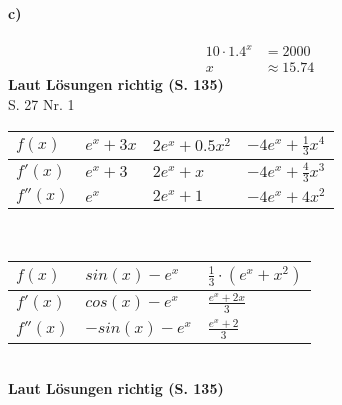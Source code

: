 \documentclass[12pt,a4paper]{report}
\newcommand{\richtig}[1]{\color{ForestGreen}\textbf{
	Laut Lösungen richtig (S. #1)
}\color{black}}
\begin{document}
	\paragraph{c)}
	\begin{align*}
		10 \cdot 1.4^x &= 2000 \\
		x &\approx 15.74
	\end{align*}
	\richtig{135}
	\\[0.5cm]
	\Large S. 27 Nr. 1
	\large
	\noindent \\[0.5cm]
	\begin{tabularx}{\linewidth}{|X|X|X|X|}
		\hline
		$f(x)$ & $e^x + 3x$ & $2e^x + 0.5x^2$ & $-4e^x + \frac{1}{3}x^4$ \\
		\hline
		$f'(x)$ & $e^x + 3$ & $2e^x + x$ & $-4e^x + \frac{4}{3}x^3$ \\
		\hline
		$f''(x)$ & $e^x$ & $2e^x + 1$ & $-4e^x + 4x^2$ \\
		\hline
	\end{tabularx}
	\\[1cm]
	\noindent
	\begin{tabularx}{\linewidth}{|X|X|X|}
		\hline
		$f(x)$ & $sin(x) - e^x$ & $\frac{1}{3}\cdot(e^x+x^2)$ \\
		\hline
		$f'(x)$ & $cos(x) - e^x$ & $\frac{e^x + 2x}{3} $\\
		\hline
		$f''(x)$ & $-sin(x) - e^x$ & $\frac{e^x + 2}{3} $\\
		\hline
	\end{tabularx}
	\\[1cm]
	\richtig{135}
\end{document}
